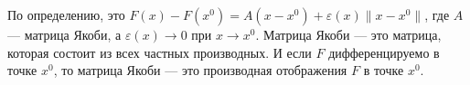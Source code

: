 

\begin{defn}
  По определению, это $F(x) - F(x^0) = A(x-x^0) + \varepsilon(x)\|x-x^0\|$, где $A$ --- матрица Якоби, а $\varepsilon(x) \to 0$ при $x \to x^0$. Матрица Якоби --- это матрица, которая состоит из всех частных производных. И если $F$ дифференцируемо в точке $x^0$, то матрица Якоби --- это производная отображения $F$ в точке $x^0$.
\end{defn}

